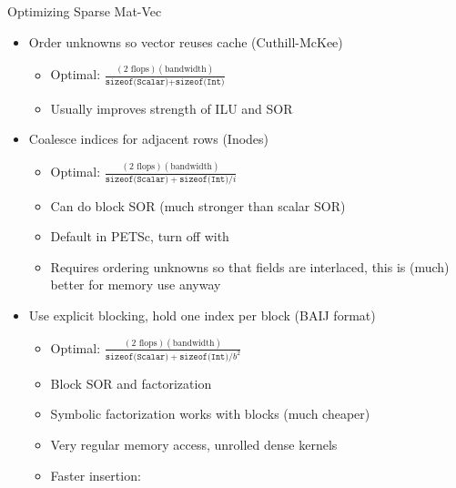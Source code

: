 \begin{frame}{Optimizing Sparse Mat-Vec}
  \begin{itemize}
  \item Order unknowns so vector reuses cache (Cuthill-McKee)
    \begin{itemize}
    \item Optimal: $\frac{(2 \text{ flops})(\text{bandwidth})}{\texttt{sizeof(Scalar)} + \texttt{sizeof(Int)}}$
    \item Usually improves strength of ILU and SOR
    \end{itemize}
  \item Coalesce indices for adjacent rows (Inodes)
    \begin{itemize}
    \item Optimal: $\frac{(2 \text{ flops})(\text{bandwidth})}{\texttt{sizeof(Scalar)} + \texttt{sizeof(Int)}/i}$
    \item Can do block SOR (much stronger than scalar SOR)
    \item Default in PETSc, turn off with 
    \item Requires ordering unknowns so that fields are interlaced, this
      is (much) better for memory use anyway
    \end{itemize}
  \item Use explicit blocking, hold one index per block (BAIJ format)
    \begin{itemize}
    \item Optimal: $\frac{(2 \text{ flops})(\text{bandwidth})}{\texttt{sizeof(Scalar)} + \texttt{sizeof(Int)}/b^2}$
    \item Block SOR and factorization
    \item Symbolic factorization works with blocks (much cheaper)
    \item Very regular memory access, unrolled dense kernels
    \item Faster insertion: 
    \end{itemize}
  \end{itemize}
\end{frame}
